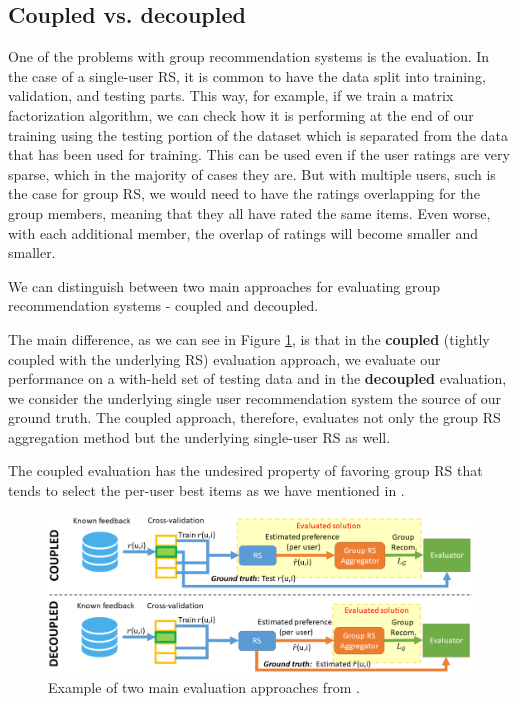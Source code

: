 \subsection{Coupled vs. decoupled} \label{subsec:07_experiments.evaluation.coupled_decoupled}
One of the problems with group recommendation systems is the evaluation. In the case of a single-user RS, it is common to have the data split into training, validation, and testing parts. This way, for example, if we train a matrix factorization algorithm, we can check how it is performing at the end of our training using the testing portion of the dataset which is separated from the data that has been used for training.
This can be used even if the user ratings are very sparse, which in the majority of cases they are. But with multiple users, such is the case for group RS, we would need to have the ratings overlapping for the group members, meaning that they all have rated the same items. Even worse, with each additional member, the overlap of ratings will become smaller and smaller.

We can distinguish between two main approaches for evaluating group recommendation systems - coupled and decoupled.

The main difference, as we can see in Figure \ref{fig:coupled_decoupled}, is that in the \textbf{coupled} (tightly coupled with the underlying RS) evaluation approach, we evaluate our performance on a with-held set of testing data and in the \textbf{decoupled} evaluation, we consider the underlying single user recommendation system the source of our ground truth. The coupled approach, therefore, evaluates not only the group RS aggregation method but the underlying single-user RS as well.

The coupled evaluation has the undesired property of favoring group RS that tends to select the per-user best items as we have mentioned in \cite{peska2021coupled}.

\begin{figure}[ht!]
    \centering
    \includegraphics[width=5.5in]{img/coupled_decoupled_evaluation.png}
    \caption{Example of two main evaluation approaches from \cite{peska2021coupled}.}
    \label{fig:coupled_decoupled}
\end{figure}

